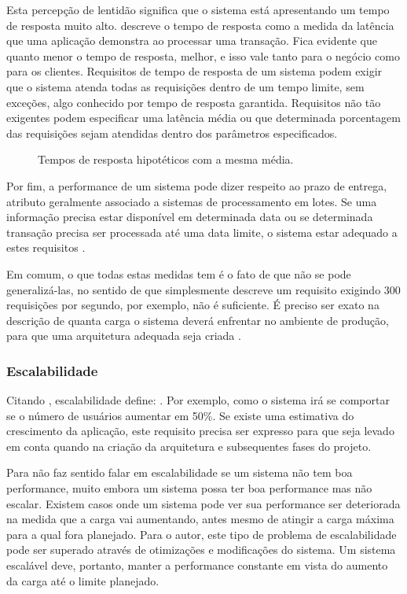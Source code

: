 \documentclass[diss]{template/setrem}
\begin{document}
Esta percepção de lentidão significa que o sistema está apresentando um tempo de resposta muito alto. \citet{Gorton2011} descreve o tempo de resposta como a medida da latência que uma aplicação demonstra ao processar uma transação. Fica evidente que quanto menor o tempo de resposta, melhor, e isso vale tanto para o negócio como para os clientes. Requisitos de tempo de resposta de um sistema podem exigir que o sistema atenda todas as requisições dentro de um tempo limite, sem exceções, algo conhecido por tempo de resposta garantida. Requisitos não tão exigentes podem especificar uma latência média ou que determinada porcentagem das requisições sejam atendidas dentro dos parâmetros especificados.

\begin{figure}[!h]
    \caption{Tempos de resposta hipotéticos com a mesma média.}
    \label{fig:average}
\end{figure}

Por fim, a performance de um sistema pode dizer respeito ao prazo de entrega, atributo geralmente associado a sistemas de processamento em lotes. Se uma informação precisa estar disponível em determinada data ou se determinada transação precisa ser processada até uma data limite, o sistema estar adequado a estes requisitos \citep{Gorton2011}.

Em comum, o que todas estas medidas tem é o fato de que não se pode generalizá-las, no sentido de que simplesmente descreve um requisito exigindo 300 requisições por segundo, por exemplo, não é suficiente. É preciso ser exato na descrição de quanta carga o sistema deverá enfrentar no ambiente de produção, para que uma arquitetura adequada seja criada \citep{Gorton2011}.

\subsubsection{Escalabilidade}
\label{subsubsec:escalabilidade}
Citando \citet[p. 27]{Gorton2011}, escalabilidade define: . Por exemplo, como o sistema irá se comportar se o número de usuários aumentar em 50\%. Se existe uma estimativa do crescimento da aplicação, este requisito precisa ser expresso para que seja levado em conta quando na criação da arquitetura e subsequentes fases do projeto.

Para \citet{Liu2009} não faz sentido falar em escalabilidade se um sistema não tem boa performance, muito embora um sistema possa ter boa performance mas não escalar. Existem casos onde um sistema pode ver sua performance ser deteriorada na medida que a carga vai aumentando, antes mesmo de atingir a carga máxima para a qual fora planejado. Para o autor, este tipo de problema de escalabilidade pode ser superado através de otimizações e modificações do sistema. Um sistema escalável deve, portanto, manter a performance constante em vista do aumento da carga até o limite planejado.
\end{document}
